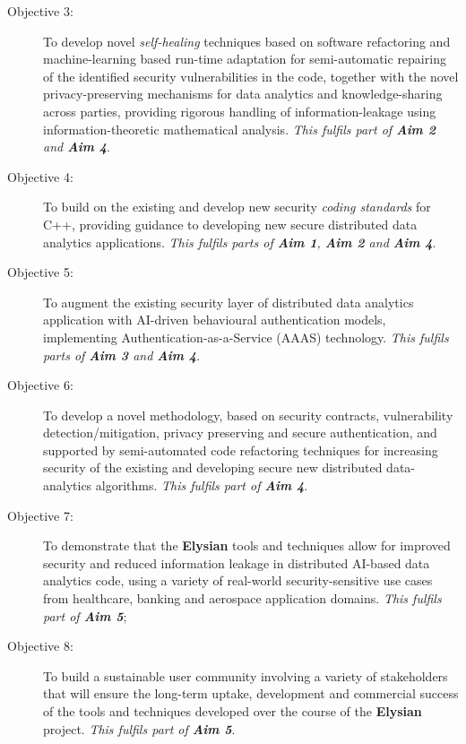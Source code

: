 \documentclass[a4paper,11pt]{article}
\newcommand{\project}[1]{\textbf{#1}\xspace}
\newcommand{\SECURITY}{\project{Elysian}}
\newcommand{\TheProject}{\SECURITY}
\begin{document}
\begin{description}
\item[Objective 3:] To develop novel \emph{self-healing} techniques based on software refactoring and machine-learning based run-time adaptation for semi-automatic repairing of the identified security vulnerabilities in the code, together with the novel privacy-preserving mechanisms for data analytics and knowledge-sharing across parties, providing rigorous handling of information-leakage using information-theoretic mathematical analysis. \emph{This fulfils part of \textbf{Aim 2} and \textbf{Aim 4}}.

\item[Objective 4:] To build on the existing and develop new security \emph{coding standards} for C++, providing guidance to developing new secure distributed data analytics applications. \emph{This fulfils parts of \textbf{Aim 1}, \textbf{Aim 2} and \textbf{Aim 4}}.

\item[Objective 5:] To augment the existing security layer of distributed data analytics application with AI-driven behavioural authentication models, implementing Authentication-as-a-Service (AAAS) technology. \emph{This fulfils parts of \textbf{Aim 3} and \textbf{Aim 4}}.

\item[Objective 6:] To develop a novel methodology, based on security contracts, vulnerability detection/mitigation,
  privacy preserving and secure authentication, and supported by semi-automated code refactoring techniques for
  increasing security of the existing and developing secure new distributed data-analytics algorithms. \emph{This fulfils
    part of \textbf{Aim 4}}.

\item[Objective 7:] To demonstrate that the \TheProject{} tools and techniques allow for improved security and reduced
  information leakage in distributed AI-based data analytics code, using a variety of real-world security-sensitive
  use cases from healthcare, banking and aerospace application domains. \emph{This fulfils part of \textbf{Aim 5}};

\item[Objective 8:] To build a sustainable user community involving a variety of stakeholders that will ensure the long-term
  uptake, development and commercial success of the tools and techniques developed over the course of the \TheProject{}
  project. \emph{This fulfils part of \textbf{Aim 5}}.

\end{description}
\end{document}
